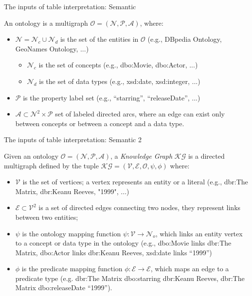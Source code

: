 \documentclass{beamer}
\begin{document}
\begin{frame}{The inputs of table interpretation: Semantic}
	\begin{definition}
		An ontology is a multigraph
		$\mathcal{O}=(\mathcal{N}, \mathcal{P}, \mathcal{A})$, where:
		\begin{itemize}
			\item $\mathcal{N} =\mathcal{N}_c \cup \mathcal{N}_d$ is the set of the entities in $\mathcal{O}$ (e.g., {DBpedia Ontology, GeoNames Ontology, ...})
			      \begin{itemize}
				      \item $\mathcal{N}_c$ is the set of concepts (e.g., {dbo:Movie, dbo:Actor, ...})
				      \item $\mathcal{N}_d$ is the set of data types (e.g., {xsd:date, xsd:integer, ...})
			      \end{itemize}
			\item $\mathcal{P}$ is the property label set (e.g., {“starring”, “releaseDate”, ...})
			\item $\mathcal{A} \subset \mathcal{N}^2\times\mathcal{P}$ set of labeled directed arcs, where an edge can exist only between concepts or between a concept and a data type.
		\end{itemize}
	\end{definition}
\end{frame}


\begin{frame}{The inputs of table interpretation: Semantic 2}
	\begin{definition} 
		Given an ontology $\mathcal{O}=(\mathcal{N},\mathcal{P}, \mathcal{A})$,
		a \textit{Knowledge Graph} $\mathcal{KG}$ \cite{SHI2016123} is a directed multigraph defined by the tuple
		$\mathcal{KG}=(\mathcal{V, E, O}, \psi, \phi)$ where:
		\begin{itemize}
			\item $\mathcal{V}$ is the set of vertices; a vertex represents an entity or a literal (e.g., {dbr:The Matrix, dbr:Keanu Reeves, "1999", ...})
			\item $\mathcal{E} \subset \mathcal{V}^2$ is a set of directed edges connecting two nodes, they represent links between two entities;
			\item $\psi$ is the ontology mapping function $\psi:\mathcal{V}\to \mathcal{N}_o$, which links an entity vertex to a concept or data type in the ontology (e.g., dbo:Movie links dbr:The Matrix, dbo:Actor links dbr:Keanu Reeves, xsd:date links “1999”)
			\item $\phi$ is the predicate mapping function $\phi:\mathcal{E} \to \mathcal{E}$, which maps an edge to a predicate type (e.g. dbr:The Matrix dbo:starring dbr:Keanu Reeves, dbr:The Matrix dbo:releaseDate “1999”).
		\end{itemize}
	\end{definition}
\end{frame}
\end{document}
